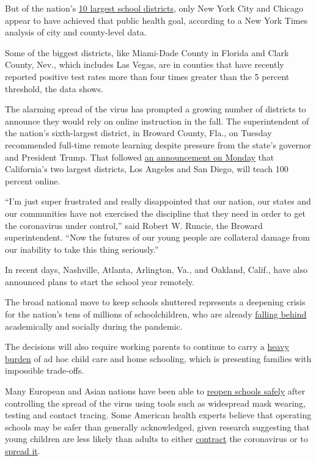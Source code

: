 But of the nation's
\href{https://nces.ed.gov/programs/digest/d17/tables/dt17_215.30.asp}{10
largest school districts}, only New York City and Chicago appear to have
achieved that public health goal, according to a New York Times analysis
of city and county-level data.

Some of the biggest districts, like Miami-Dade County in Florida and
Clark County, Nev., which includes Las Vegas, are in counties that have
recently reported positive test rates more than four times greater than
the 5 percent threshold, the data shows.

The alarming spread of the virus has prompted a growing number of
districts to announce they would rely on online instruction in the fall.
The superintendent of the nation's sixth-largest district, in Broward
County, Fla., on Tuesday recommended full-time remote learning despite
pressure from the state's governor and President Trump. That followed
\href{https://www.nytimes3xbfgragh.onion/2020/07/13/us/lausd-san-diego-school-reopening.html}{an
announcement on Monday} that California's two largest districts, Los
Angeles and San Diego, will teach 100 percent online.

``I'm just super frustrated and really disappointed that our nation, our
states and our communities have not exercised the discipline that they
need in order to get the coronavirus under control,'' said Robert W.
Runcie, the Broward superintendent. ``Now the futures of our young
people are collateral damage from our inability to take this thing
seriously.''

In recent days, Nashville, Atlanta, Arlington, Va., and Oakland, Calif.,
have also announced plans to start the school year remotely.

The broad national move to keep schools shuttered represents a deepening
crisis for the nation's tens of millions of schoolchildren, who are
already
\href{https://www.nytimes3xbfgragh.onion/2020/06/05/us/coronavirus-education-lost-learning.html}{falling
behind} academically and socially during the pandemic.

The decisions will also require working parents to continue to carry a
\href{https://www.nytimes3xbfgragh.onion/2020/07/10/nyregion/nyc-school-daycare-reopening.html}{heavy
burden} of ad hoc child care and home schooling, which is presenting
families with impossible trade-offs.

Many European and Asian nations have been able to
\href{https://www.nytimes3xbfgragh.onion/2020/07/11/health/coronavirus-schools-reopen.html}{reopen
schools safely} after controlling the spread of the virus using tools
such as widespread mask wearing, testing and contact tracing. Some
American health experts believe that operating schools may be safer than
generally acknowledged, given research suggesting that young children
are less likely than adults to either
\href{https://pubmed.ncbi.nlm.nih.gov/32546824/}{contract} the
coronavirus or to
\href{https://pediatrics.aappublications.org/content/early/2020/07/08/peds.2020-004879}{spread
it}.

